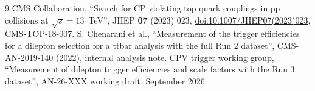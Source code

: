 \clearpage
\newpage
\begin{thebibliography}{9}
 CMS Collaboration, ``Search for CP violating top quark couplings in pp collisions at $\sqrt{s}=13$~TeV'', JHEP \textbf{07} (2023) 023, \href{https://doi.org/10.1007/JHEP07(2023)023}{doi:10.1007/JHEP07(2023)023}, CMS-TOP-18-007.
 S. Chenarani et al., ``Measurement of the trigger efficiencies for a dilepton selection for a ttbar analysis with the full Run 2 dataset'', CMS-AN-2019-140 (2022), internal analysis note.
 CPV trigger working group, ``Measurement of dilepton trigger efficiencies and scale factors with the Run 3 dataset'', AN-26-XXX working draft, September 2026.
\end{thebibliography}

\clearpage
\appendix

